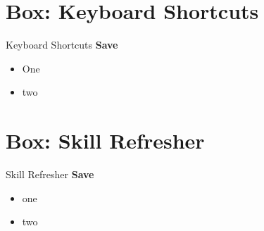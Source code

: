 \section{Box: Keyboard Shortcuts}
\begin{center}
	\begin{shtcutbox}{Keyboard Shortcuts}
		\textbf{Save}
		\\
		\begin{itemize}
			\setlength{\itemsep}{0pt}
			\setlength{\parskip}{0pt}
			\setlength{\parsep}{0pt}
			
			\item One
			\item two
			
		\end{itemize}
	\end{shtcutbox}
\end{center}

\section{Box: Skill Refresher}
\begin{center}
	\begin{sklbox}{Skill Refresher}
		\textbf{Save}
		\\
		\begin{itemize}
			\setlength{\itemsep}{0pt}
			\setlength{\parskip}{0pt}
			\setlength{\parsep}{0pt}
			
			\item one
			\item two
			
		\end{itemize}
	\end{sklbox}
\end{center}


